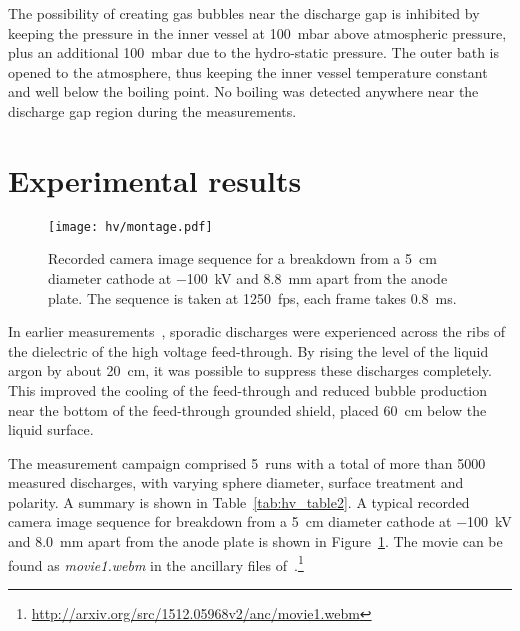 The possibility of creating gas bubbles near the discharge gap is inhibited by keeping the pressure in the inner vessel at \SI{100}{\milli\bar} above atmospheric pressure, plus an additional \SI{100}{\milli\bar} due to the hydro-static pressure.
The outer bath is opened to the atmosphere, thus keeping the inner vessel temperature constant and well below the boiling point.
No boiling was detected anywhere near the discharge gap region during the measurements.


\section{Experimental results}

\begin{figure}[htb]
	\centering	
	\texttt{[image: hv/montage.pdf]}
	\caption{Recorded camera image sequence for a breakdown from a \SI{5}{\centi\metre} diameter cathode at \SI{-100}{\kilo\volt} and \SI{8.8}{\milli\metre} apart from the anode plate. The sequence is taken at \SI{1250}{fps}, each frame takes \SI{0.8}{\milli\second}.}
	\label{fig:hv_images}
\end{figure}

In earlier measurements~\cite{breakdown_14}, sporadic discharges were experienced across the ribs of the dielectric of the high voltage feed-through.
By rising the level of the liquid argon by about \SI{20}{\centi\metre}, it was possible to suppress these discharges completely.
This improved the cooling of the feed-through and reduced bubble production near the bottom of the feed-through grounded shield, placed \SI{60}{\centi\metre} below the liquid surface. 

The measurement campaign comprised \num{5}~runs with a total of more than \num{5000} measured discharges, with varying sphere diameter, surface treatment and polarity.
A summary is shown in Table~\ref{tab:hv_table2}.
A typical recorded camera image sequence for breakdown from a \SI{5}{\centi\metre} diameter cathode at \SI{-100}{\kilo\volt} and \SI{8.0}{\milli\metre} apart from the anode plate is shown in Figure~\ref{fig:hv_images}.
The movie can be found as \emph{movie1.webm} in the ancillary files of~\cite{breakdown_16}.\footnote{\href{http://arxiv.org/src/1512.05968v2/anc/movie1.webm}{http://arxiv.org/src/1512.05968v2/anc/movie1.webm}}

